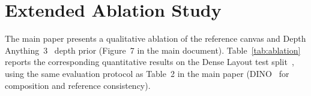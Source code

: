 \documentclass[runningheads]{llncs}
\begin{document}
\begin{table}[t]
  \centering
  \caption{Numerical and spatial reasoning on COCO-GR~\cite{feng2023layoutgpt}.
  GLIP-Accuracy measures image-level count/spatial compliance~\cite{li2022glip}.}
  \label{tab:layout_reasoning}
\end{table}

\section{Extended Ablation Study}
\label{sec:ablation}

The main paper presents a qualitative ablation of the reference canvas and Depth Anything~3~\cite{depthanything3} depth prior (Figure~7 in the main document).
Table~\ref{tab:ablation} reports the corresponding quantitative results on the Dense Layout test split~\cite{xiang2025instanceassemble}, using the same evaluation protocol as Table~2 in the main paper (DINO~\cite{caron2021dino} for composition and reference consistency).
\end{document}
